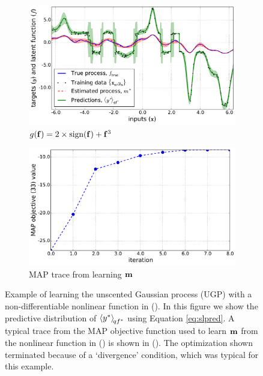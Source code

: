 \documentclass{article} %
\begin{document}
%
\begin{figure}[tb]
    \begin{subfigure}[b]{0.5\linewidth}
        \includegraphics[width=\linewidth]{fig/signdemo}
        \caption{$g\!\left({{\mathbf{f}}}\right) = 2\times\text{sign}\!\left({\mathbf{f}}\right)
            + \mathbf{f}^3$}
        \label{sub:sign}
    \end{subfigure}
    \begin{subfigure}[b]{0.5\linewidth}
        \includegraphics[width=\linewidth]{fig/trace}
        \caption{MAP trace from learning $\mathbf{m}$}
        \label{sub:mape}
        \vspace{0.5mm}
    \end{subfigure}

    \caption[]{Example of learning the unscented Gaussian process (UGP) with a
        non-differentiable nonlinear function in (). In this
        figure we show the predictive distribution of
        $\left\langle{\ensuremath{y}\ensuremath{^{*}}}\right\rangle_{\!{qf^{*}}}$ using Equation \eqref{eq:slpred}.
        A typical trace from the MAP objective function used to learn $\mathbf{m}$
        from the nonlinear function in () is shown in
        (). The optimization shown terminated because of a
        `divergence' condition, which was typical for this example.}

    \label{fig:learnex}
\end{figure}
\end{document}
